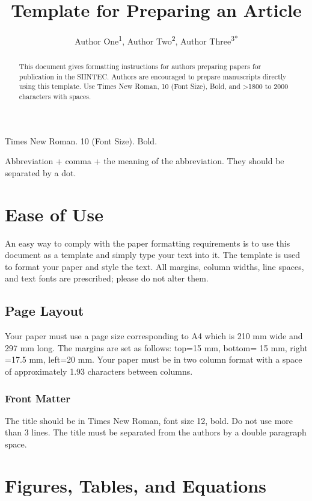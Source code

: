 \documentclass[a4paper,12pt,twocolumn]{article}
\title{Template for Preparing an Article}
\author{Author One\textsuperscript{1}, Author Two\textsuperscript{2}, Author Three\textsuperscript{3*}}
\date{}
\begin{document}
\maketitle

\begin{abstract}
This document gives formatting instructions for authors preparing papers for publication in the SIINTEC. Authors are encouraged to prepare manuscripts directly using this template. Use Times New Roman, 10 (Font Size), Bold, and >1800 to 2000 characters with spaces.
\end{abstract}

\begin{keywords}
Times New Roman. 10 (Font Size). Bold.
\end{keywords}

\begin{abbreviations}
Abbreviation + comma + the meaning of the abbreviation. They should be separated by a dot.
\end{abbreviations}
\normalsize

\section{Ease of Use}
An easy way to comply with the paper formatting requirements is to use this document as a template and simply type your text into it. The template is used to format your paper and style the text. All margins, column widths, line spaces, and text fonts are prescribed; please do not alter them.

\subsection{Page Layout}
Your paper must use a page size corresponding to A4 which is 210 mm wide and 297 mm long. The margins are set as follows: top=15 mm, bottom= 15 mm, right =17.5 mm, left=20 mm. Your paper must be in two column format with a space of approximately 1.93 characters between columns.

\subsubsection{Front Matter}
The title should be in Times New Roman, font size 12, bold. Do not use more than 3 lines. The title must be separated from the authors by a double paragraph space.

\section{Figures, Tables, and Equations}
\lipsum[2]
\end{document}
